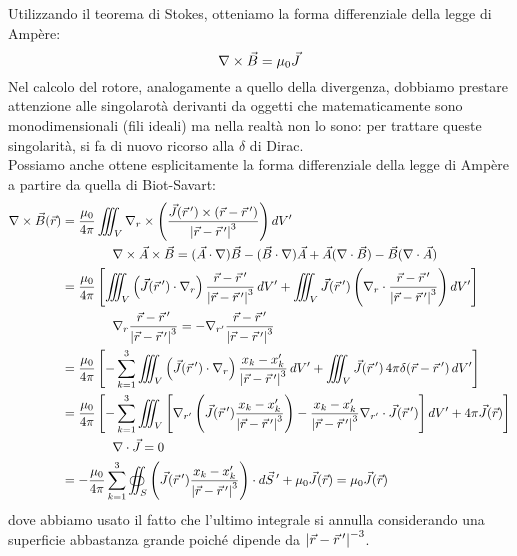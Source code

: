 Utilizzando il teorema di Stokes, otteniamo la forma differenziale della legge di Ampère:
\begin{equation}
	\nabla\times\vec{B} = \mu_0 \vec{J}
	\label{eq:ampere-diff}
\end{equation}
Nel calcolo del rotore, analogamente a quello della divergenza, dobbiamo prestare attenzione alle singolarotà derivanti da oggetti che matematicamente sono monodimensionali (fili ideali) ma nella realtà non lo sono: per trattare queste singolarità, si fa di nuovo ricorso alla $ \delta $ di Dirac. \\ 
%
Possiamo anche ottene esplicitamente la forma differenziale della legge di Ampère a partire da quella di Biot-Savart:
\begin{equation}
	\begin{split}
	 	\nabla\times\vec{B}(\vec{r}) &= \displaystyle\frac{\mu_0}{4\pi} \iiint_V \nabla_r \times \left( \displaystyle\frac{\vec{J}(\vec{r}\,') \times (\vec{r} - \vec{r}\,')}{\left\lvert\vec{r} - \vec{r}\,'\right\rvert^3} \right) dV' \\
				     & \qquad\qquad \nabla\times\vec{A}\times\vec{B} = (\vec{A}\cdot\nabla)\vec{B} - (\vec{B}\cdot\nabla)\vec{A} + \vec{A}(\nabla\cdot\vec{B}) - \vec{B}(\nabla\cdot\vec{A}) \\ 
				     &= \displaystyle\frac{\mu_0}{4\pi} \left[ \iiint_V \left( \vec{J}(\vec{r}\,') \cdot \nabla_r \right) \frac{\vec{r} - \vec{r}\,'}{\left\lvert\vec{r} - \vec{r}\,'\right\rvert^3} \, dV' + \iiint_V \vec{J}(\vec{r}\,') \left( \nabla_r \cdot \frac{\vec{r} - \vec{r}\,'}{\left\lvert\vec{r} - \vec{r}\,'\right\rvert^3} \right) dV' \right] \\ 
				     & \qquad\qquad \nabla_r \frac{\vec{r} - \vec{r}\,'}{\left\lvert\vec{r} - \vec{r}\,'\right\rvert^3} = - \nabla_{r'} \frac{\vec{r} - \vec{r}\,'}{\left\lvert\vec{r} - \vec{r}\,'\right\rvert^3} \\ 
				     &= \displaystyle\frac{\mu_0}{4\pi} \left[ -\displaystyle\sum_{k = 1}^{3} \iiint_V \left( \vec{J}(\vec{r}\,') \cdot \nabla_r \right) \frac{x_k - x'_k}{\left\lvert\vec{r} - \vec{r}\,'\right\rvert^3} \, dV' + \iiint_V \vec{J}(\vec{r}\,') \, 4\pi \delta(\vec{r} - \vec{r}\,') \,  dV' \right] \\
				     &=  \displaystyle\frac{\mu_0}{4\pi} \left[ -\displaystyle\sum_{k = 1}^{3} \iiint_V \left[ \nabla_{r'} \left( \vec{J}(\vec{r}\,') \frac{x_k - x'_k}{\left\lvert\vec{r} - \vec{r}\,'\right\rvert^3} \right) -  \frac{x_k - x'_k}{\left\lvert\vec{r} - \vec{r}\,'\right\rvert^3} \nabla_{r'} \cdot \vec{J}(\vec{r}\,') \right] dV' + 4\pi\vec{J}(\vec{r}) \right] \\ 
				     & \qquad\qquad \nabla\cdot\vec{J} = 0 \\ 
				     &= - \displaystyle\frac{\mu_0}{4\pi} \displaystyle\sum_{k = 1}^{3} \oiint_S \left( \vec{J}(\vec{r}\,') \frac{x_k - x'_k}{\left\lvert\vec{r} - \vec{r}\,'\right\rvert^3} \right) \cdot d\vec{S}\,' + \mu_0 \vec{J}(\vec{r}) = \mu_0 \vec{J}(\vec{r})
	\end{split}
	\label{eq:}
\end{equation}
dove abbiamo usato il fatto che l'ultimo integrale si annulla considerando una superficie abbastanza grande poiché dipende da $ \left\lvert\vec{r} - \vec{r}\,'\right\rvert^{-3} $.

